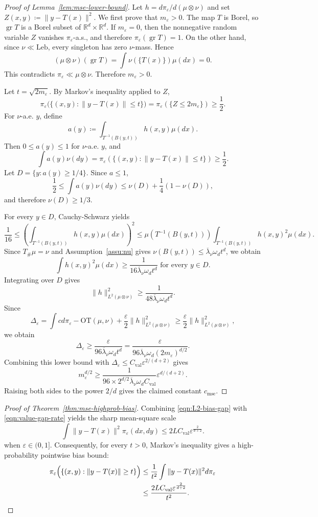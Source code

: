 \documentclass{article}
\theoremstyle{plain}
\theoremstyle{definition}
\theoremstyle{remark}
\numberwithin{equation}{section}
\DeclareMathOperator{\gr}{gr}
\newcommand{\R}{\mathbb{R}}
\newcommand{\OT}{\mathrm{OT}}
\newcommand{\Leb}{\mathrm{Leb}}
\begin{document}
\begin{proof}[Proof of Lemma~\ref{lem:mse-lower-bound}]
Let $h=d\pi_\varepsilon/d(\mu\otimes\nu)$ and set $Z(x,y)\coloneqq\|y-T(x)\|^2$.
We first prove that $m_\varepsilon>0$. 
The map $T$ is Borel, so $\gr T$ is a Borel subset of $\R^d\times\R^d$. 
If $m_\varepsilon=0$, then the nonnegative random variable $Z$ vanishes $\pi_\varepsilon$-a.s., and therefore $\pi_\varepsilon(\gr T)=1$.
On the other hand, since $\nu\ll\Leb$, every singleton has zero $\nu$-mass.
Hence
\[
(\mu\otimes\nu)(\gr T)=\int\nu(\{T(x)\})\mu(dx)=0.
\]
This contradicts $\pi_\varepsilon\ll\mu\otimes\nu$. 
Therefore $m_\varepsilon>0$.

Let $t=\sqrt{2m_\varepsilon}$. 
By Markov's inequality applied to $Z$,
\[
\pi_\varepsilon\bigl(\{(x,y):\|y-T(x)\|\le t\}\bigr)=\pi_\varepsilon(\{Z\le 2m_\varepsilon\})\ge\frac12.
\]
For $\nu$-a.e. $y$, define
$$
a(y)\coloneqq
\int_{T^{-1}(B(y,t))}h(x,y)\mu(dx).
$$
Then $0\le a(y)\le 1$ for $\nu$-a.e. $y$, and
$$
\int a(y)\nu(dy)
=
\pi_\varepsilon(\{(x,y):\|y-T(x)\|\le t\})
\ge \frac12.
$$
Let $D=\{y:a(y)\ge 1/4\}$. 
Since $a\le 1$,
$$
\frac12
\le
\int a(y)\nu(dy)
\le
\nu(D)+\frac14(1-\nu(D)),
$$
and therefore $\nu(D)\ge 1/3$.

For every $y\in D$, Cauchy-Schwarz yields
$$
\frac{1}{16}
\le
\left(\int_{T^{-1}(B(y,t))}h(x,y)\mu(dx)\right)^2
\le
\mu(T^{-1}(B(y,t)))
\int_{T^{-1}(B(y,t))}h(x,y)^2\mu(dx).
$$
Since $T_\#\mu=\nu$ and Assumption~\ref{assu:nu} gives $\nu(B(y,t))\le\overline\lambda_\nu\omega_dt^d$, we obtain
\[
\int h(x,y)^2\mu(dx)\ge\frac{1}{16\overline\lambda_\nu\omega_dt^d}\text{ for every }y\in D.
\]
Integrating over $D$ gives
$$
\|h\|_{L^2(\mu\otimes\nu)}^2
\ge
\frac{1}{48\overline\lambda_\nu\omega_dt^d}.
$$
Since
$$
\Delta_\varepsilon
=
\int cd\pi_\varepsilon-\OT(\mu,\nu)
+
\frac{\varepsilon}{2}\|h\|_{L^2(\mu\otimes\nu)}^2
\ge
\frac{\varepsilon}{2}\|h\|_{L^2(\mu\otimes\nu)}^2,
$$
we obtain
$$
\Delta_\varepsilon\ge\frac{\varepsilon}{96\overline\lambda_\nu\omega_dt^d}=\frac{\varepsilon}{96\overline\lambda_\nu\omega_d(2m_\varepsilon)^{d/2}}.
$$
Combining this lower bound with $\Delta_\varepsilon\le C_{\mathrm{val}}\varepsilon^{2/(d+2)}$ gives
$$
m_\varepsilon^{d/2}\ge\frac{1}{96\times2^{d/2}\overline\lambda_\nu\omega_d C_{\mathrm{val}}}\varepsilon^{d/(d+2)}.
$$
Raising both sides to the power $2/d$ gives the claimed constant $c_{\mathrm{mse}}$.
\end{proof}

\begin{proof}[Proof of Theorem~\ref{thm:mse-highprob-bias}]
Combining \eqref{eqn:L2-bias-gap} with \eqref{eqn:value-gap-rate} yields the sharp mean-square scale
$$
\int\|y-T(x)\|^2\pi_\varepsilon(dx,dy)\le 2LC_{\mathrm{val}}\varepsilon^{\frac{2}{d+2}}.
$$
when $\varepsilon\in (0,1]$.
Consequently, for every $t>0$, Markov's inequality gives a high-probability pointwise bias bound:
$$
\begin{aligned}
\pi_\varepsilon\Bigl(\{(x,y):\|y-T(x)\|\ge t\}\Bigr)&\le\frac{1}{t^2}\int\|y-T(x)\|^2d\pi_\varepsilon\\
&\le\frac{2LC_{\mathrm{val}}\varepsilon^{\frac{2}{d+2}}}{t^2}.
\end{aligned}
$$
\end{proof}
\end{document}
